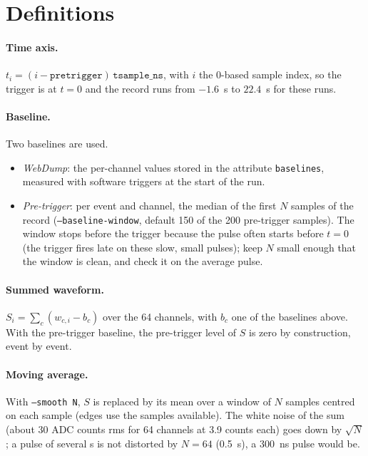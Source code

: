 \documentclass[11pt]{article}
\newcommand{\code}[1]{\texttt{#1}}
\newcommand{\us}{\textmu s}
\begin{document}
\section{Definitions}

\paragraph{Time axis.} $t_i = (i - \code{pretrigger})\,\code{tsample\_ns}$,
with $i$ the 0-based sample index, so the trigger is at $t = 0$ and the record
runs from $-1.6$~\us{} to $22.4$~\us{} for these runs.

\paragraph{Baseline.} Two baselines are used.
\begin{itemize}
\item \emph{WebDump}: the per-channel values stored in the attribute
  \code{baselines}, measured with software triggers at the start of the run.
\item \emph{Pre-trigger}: per event and channel, the median of the first $N$
  samples of the record (\code{--baseline-window}, default 150 of the 200
  pre-trigger samples). The window stops before the trigger because the
  pulse often starts before $t = 0$ (the trigger fires late on these slow,
  small pulses); keep $N$ small enough that the window is clean, and check
  it on the average pulse.
\end{itemize}

\paragraph{Summed waveform.} $S_i = \sum_c (w_{c,i} - b_c)$ over the 64
channels, with $b_c$ one of the baselines above. With the pre-trigger
baseline, the pre-trigger level of $S$ is zero by construction, event by
event.

\paragraph{Moving average.} With \code{--smooth N}, $S$ is replaced by its
mean over a window of $N$ samples centred on each sample (edges use the
samples available). The white noise of the sum (about 30 ADC counts rms for
64 channels at 3.9 counts each) goes down by $\sqrt{N}$; a pulse of several
\us{} is not distorted by $N = 64$ (0.5~\us), a 300~ns pulse would be.
\end{document}
